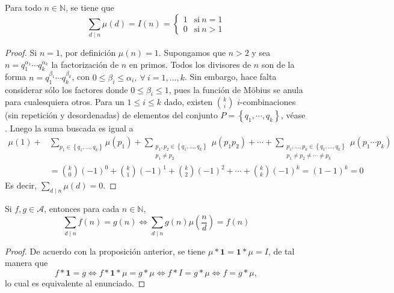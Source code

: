 \begin{proposition}\label{prop:mob2}
Para todo $n\in\mathbb{N}$, se tiene que 
\begin{equation*}
	\sum_{d \mid n} \mu(d) = I(n) =
		\begin{cases}
			1 & \text{si} \: n=1 \\ %
			0 & \text{si} \: n>1
		\end{cases}
\end{equation*}
\end{proposition}
\begin{proof}
Si $n=1$, por definición $\mu(n)=1$. Supongamos que $n>2$ y sea $n=q_1^{\alpha_1}\cdots q_k^{\alpha_k}$ la factorización de $n$ en primos. Todos los divisores de $n$ son de la forma $n=q_1^{\beta_1}\cdots q_k^{\beta_k}$, con $0\leq \beta_i\leq \alpha_i,\:\forall \: i=1,\ldots,k$. Sin embargo, hace falta considerar sólo los factores donde $0\leq \beta_i\leq 1$, pues la función de Möbius se anula para cualesquiera otros. Para un $1\leq i\leq k$ dado, existen $\binom{k}{i}$ $i$-combinaciones (sin repetición y desordenadas) de elementos del conjunto $P=\left\{q_1,\cdots,q_k\right\}$, véase \cite{Br1-1999}. Luego la suma buscada es igual a
\begin{align*}
    \mu(1)+&\sum_{p_1\in\left\{q_1,\ldots,q_k\right\}} \mu(p_1) + \sum_{\substack{p_1,p_2\in \left\{q_1,\ldots,q_k\right\} \\ p_1\neq p_2}} \mu(p_1 p_2)+\cdots+\sum_{\substack{p_1,\ldots,p_k\in \left\{q_1,\ldots,q_k\right\} \\ p_1\neq p_2 \neq \cdots \neq p_k}} \mu(p_1\cdots p_k) \\
						   &= \binom{k}{0}(-1)^0+\binom{k}{1}(-1)^1+\binom{k}{2}(-1)^2+\cdots+\binom{k}{k}(-1)^k =  (1-1)^k=0
\end{align*}
Es decir, $\sum_{d \mid n} \mu(d)=0$.
\end{proof}

\begin{corollary}\label{cor:mob1}
Si $f,g \in \mathcal{A}$, entonces para cada $n \in \mathbb{N}$,
\begin{equation*}
    \sum_{d \mid n} f(n) = g(n) \iff \sum_{d \mid n} g(n)\mu \left( \frac{n}{d} \right) = f(n)
\end{equation*}
\end{corollary}
\begin{proof}
De acuerdo con la proposición anterior, se tiene $\mu*\mathbf{1}=\mathbf{1}*\mu=I$, de tal manera que
\begin{equation*}
    f*\mathbf{1} =  g \iff f*\mathbf{1}*\mu = g * \mu \iff f*I = g * \mu \iff f = g * \mu,
\end{equation*}
lo cual es equivalente al enunciado.
\end{proof}

